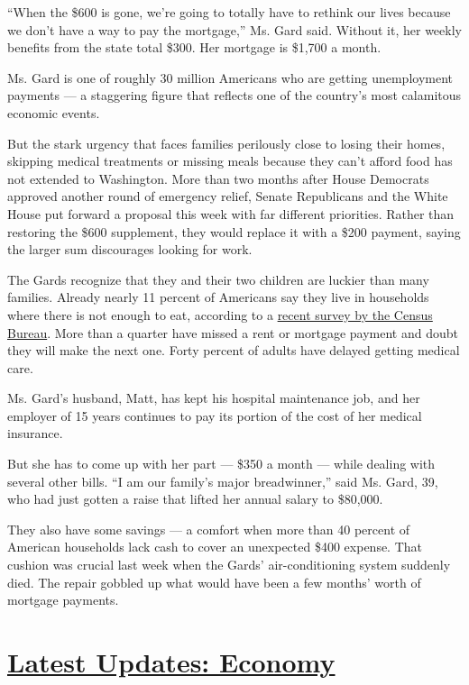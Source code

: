 ``When the \$600 is gone, we're going to totally have to rethink our
lives because we don't have a way to pay the mortgage,'' Ms. Gard said.
Without it, her weekly benefits from the state total \$300. Her mortgage
is \$1,700 a month.

Ms. Gard is one of roughly 30 million Americans who are getting
unemployment payments --- a staggering figure that reflects one of the
country's most calamitous economic events.

But the stark urgency that faces families perilously close to losing
their homes, skipping medical treatments or missing meals because they
can't afford food has not extended to Washington. More than two months
after House Democrats approved another round of emergency relief, Senate
Republicans and the White House put forward a proposal this week with
far different priorities. Rather than restoring the \$600 supplement,
they would replace it with a \$200 payment, saying the larger sum
discourages looking for work.

The Gards recognize that they and their two children are luckier than
many families. Already nearly 11 percent of Americans say they live in
households where there is not enough to eat, according to a
\href{https://www.census.gov/programs-surveys/household-pulse-survey/data.html?utm_campaign=20200727mspuls1ccdtanl\&utm_medium=email\&utm_source=govdelivery}{recent
survey by the Census Bureau}. More than a quarter have missed a rent or
mortgage payment and doubt they will make the next one. Forty percent of
adults have delayed getting medical care.

Ms. Gard's husband, Matt, has kept his hospital maintenance job, and her
employer of 15 years continues to pay its portion of the cost of her
medical insurance.

But she has to come up with her part --- \$350 a month --- while dealing
with several other bills. ``I am our family's major breadwinner,'' said
Ms. Gard, 39, who had just gotten a raise that lifted her annual salary
to \$80,000.

They also have some savings --- a comfort when more than 40 percent of
American households lack cash to cover an unexpected \$400 expense. That
cushion was crucial last week when the Gards' air-conditioning system
suddenly died. The repair gobbled up what would have been a few months'
worth of mortgage payments.

\hypertarget{latest-updates-economy}{%
\section{\texorpdfstring{\href{https://www.nytimes.com/live/2020/08/04/business/stock-market-today-coronavirus?action=click\&pgtype=Article\&state=default\&region=MAIN_CONTENT_1\&context=storylines_live_updates}{Latest
Updates:
Economy}}{Latest Updates: Economy}}\label{latest-updates-economy}}

